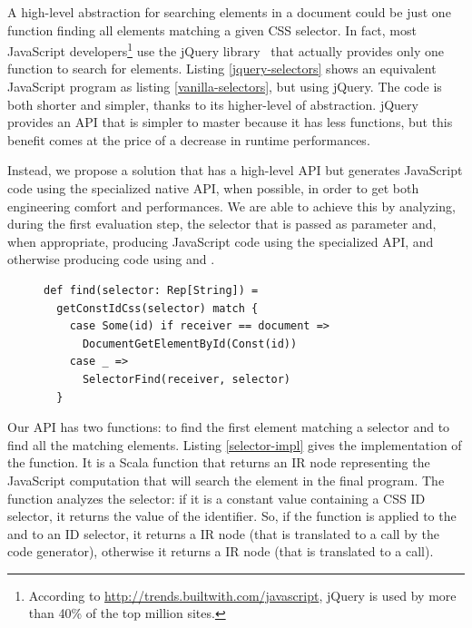 \documentclass[preprint]{sigplanconf}
\begin{document}
A high-level abstraction for searching elements in a document could be just one function
finding all elements matching a given CSS selector. In fact, most JavaScript
developers\footnote{According to
\href{http://trends.builtwith.com/javascript}{http://trends.builtwith.com/javascript}, jQuery is
used by more than 40\% of the top million sites.} use the jQuery library~\cite{Bibeault08_jQuery}
that actually provides only one function to search for elements. Listing \ref{jquery-selectors}
shows an equivalent JavaScript program as listing \ref{vanilla-selectors}, but using jQuery. The
code is both shorter and simpler, thanks to its higher-level of abstraction. jQuery provides an API
that is simpler to master because it has less functions, but this benefit comes at the price of a
decrease in runtime performances.

Instead, we propose a solution that has a high-level API but generates JavaScript code using the
specialized native API, when possible, in order to get both engineering comfort and performances.
We are able to achieve this by analyzing, during the first evaluation step, the selector that is
passed as parameter and, when appropriate, producing JavaScript code using the specialized API,
and otherwise producing code using  and .

\begin{figure}
\begin{lstlisting}[label=selector-impl,caption=Selectors optimization]
def find(selector: Rep[String]) =
  getConstIdCss(selector) match {
    case Some(id) if receiver == document =>
      DocumentGetElementById(Const(id))
    case _ =>
      SelectorFind(receiver, selector)
  }
\end{lstlisting}
\end{figure}

Our API has two functions:  to find the first element matching a selector and
 to find all the matching elements. Listing \ref{selector-impl} gives the
implementation of the  function. It is a Scala function that returns an IR node
representing the JavaScript computation that will search the element in the final program. The
 function analyzes the selector: if it is a constant  value
containing a CSS ID selector, it returns the value of the identifier. So, if the 
function is applied to the  and to an ID selector, it returns a
 IR node (that is translated to a  call
by the code generator), otherwise it returns a  IR node (that is translated to a
 call).
\end{document}
